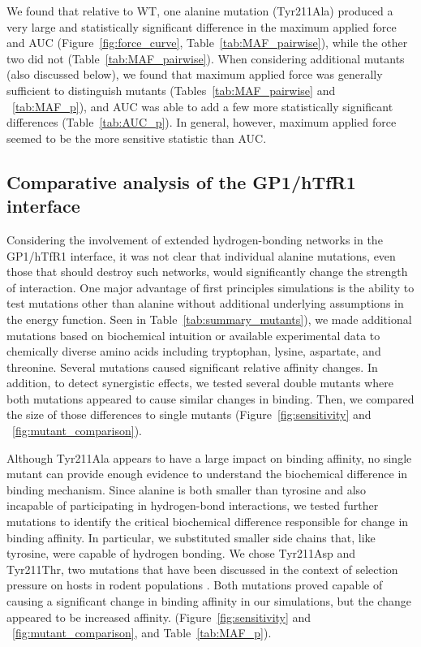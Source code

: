 \documentclass[12pt]{article}
\begin{document}
We found that relative to WT, one alanine mutation (Tyr211Ala) produced a very large and statistically significant difference in the maximum applied force and AUC (Figure~\ref{fig:force_curve}, Table~\ref{tab:MAF_pairwise}), while the other two did not (Table~\ref{tab:MAF_pairwise}). When considering additional mutants (also discussed below), we found that maximum applied force was generally sufficient to distinguish mutants (Tables~\ref{tab:MAF_pairwise} and ~\ref{tab:MAF_p}), and AUC was able to add a few more statistically significant differences (Table~\ref{tab:AUC_p}). In general, however, maximum applied force seemed to be the more sensitive statistic than AUC.

\subsection*{Comparative analysis of the GP1/hTfR1 interface}
Considering the involvement of extended hydrogen-bonding networks in the GP1/hTfR1 interface, it was not clear that individual alanine mutations, even those that should destroy such networks, would significantly change the strength of interaction. One major advantage of first principles simulations is the ability to test mutations other than alanine without additional underlying assumptions in the energy function. Seen in Table~\ref{tab:summary_mutants}), we made additional mutations based on biochemical intuition or available experimental data to chemically diverse amino acids including tryptophan, lysine, aspartate, and threonine. Several mutations caused significant relative affinity changes. In addition, to detect synergistic effects, we tested several double mutants where both mutations appeared to cause similar changes in binding. Then, we compared the size of those differences to single mutants (Figure~\ref{fig:sensitivity} and ~\ref{fig:mutant_comparison}).

Although Tyr211Ala appears to have a large impact on binding affinity, no single mutant can provide enough evidence to understand the biochemical difference in binding mechanism. Since alanine is both smaller than tyrosine and also incapable of participating in hydrogen-bond interactions, we tested further mutations to identify the critical biochemical difference responsible for change in binding affinity. In particular, we substituted smaller side chains that, like tyrosine, were capable of hydrogen bonding. We chose Tyr211Asp and Tyr211Thr, two mutations that have been discussed in the context of selection pressure on hosts in rodent populations \citep{Rad2008,Rad20111,Rad20112}. Both mutations proved capable of causing a significant change in binding affinity in our simulations, but the change appeared to be increased affinity. (Figure~\ref{fig:sensitivity} and ~\ref{fig:mutant_comparison}, and Table~\ref{tab:MAF_p}).
\end{document}
